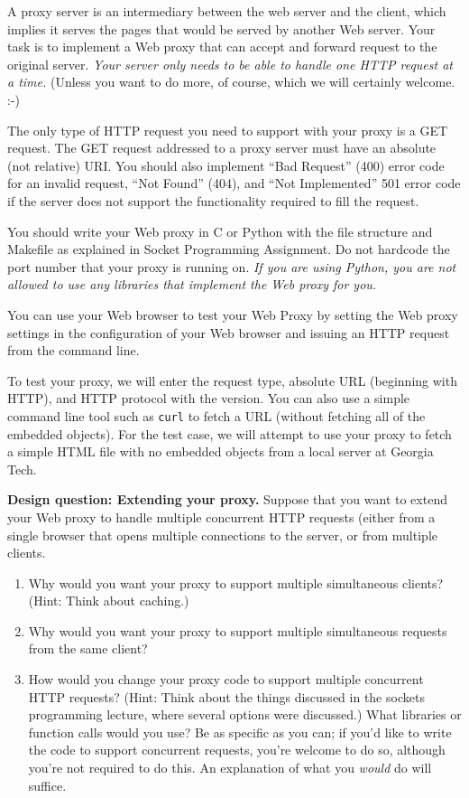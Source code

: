 \documentclass[11pt]{article}
\begin{document}
A proxy server is an intermediary between the web server and the client,
which implies it serves the pages that would be served by another Web
server.  Your task is to implement a Web proxy that can accept and
forward request to the original server. {\em Your server only needs to be
able to handle one HTTP request at a time.}  (Unless you want to do
more, of course, which we will certainly welcome. :-)

The only type of HTTP request you need to support with your proxy is a
GET request. The GET request addressed to a proxy server must have an
absolute (not relative) URI. You should also implement ``Bad Request''
(400) error code for an invalid request, ``Not Found'' (404), and ``Not
Implemented'' 501 error code if the server does not support the
functionality required to fill the request.


You should write your Web proxy in C or Python with the file structure
and Makefile as explained in Socket Programming Assignment.  Do not
hardcode the port number that your proxy is running on.  {\em If you are
  using Python, you are not allowed to use any libraries that implement
  the Web proxy for you.}

You can use your Web browser to test your Web Proxy by setting the Web
proxy settings in the configuration of your Web browser and issuing an
HTTP request from the command line.

To test your proxy, we will enter the request type, absolute URL
(beginning with HTTP), and HTTP protocol with the version.  You can also
use a simple command line tool such as {\tt curl} to fetch a URL
(without fetching all of the embedded objects).  For the test
case, we will attempt to use your proxy to fetch a simple HTML file with
no embedded objects from a local server at Georgia Tech.


{\bf Design question: Extending your proxy.}  Suppose that you want to
extend your Web proxy to handle multiple concurrent HTTP requests
(either from a single browser that opens multiple connections to the
server, or from multiple clients.

\begin{enumerate}
\item Why would you want your proxy to support multiple simultaneous
  clients? (Hint: Think about caching.)
\item Why would you want your proxy to support multiple simultaneous
  requests from the same client?
\item How would you change your proxy code to support multiple
  concurrent HTTP requests?  (Hint: Think about the things discussed in
  the sockets programming lecture, where several options were
  discussed.)  What libraries or function calls would you use? Be as
  specific as you can; if you'd like to write the code to support
  concurrent requests, you're welcome to do so, although you're not
  required to do this.  An explanation of what you {\em would} do will
  suffice. 
\end{enumerate}
\end{document}
